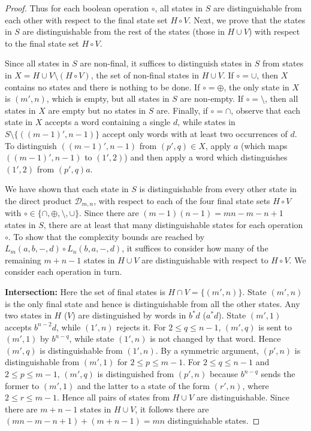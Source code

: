 \documentclass[final]{dmtcs-episciences}
\renewcommand{\le}{\leqslant}
\newcommand{\noin}{\noindent}
\newcommand{\cD}{{\mathcal D}}
\theoremstyle{definition}
\theoremstyle{remark}
\begin{document}
\begin{proof}
Thus for each boolean operation $\circ$, all 
states in $S$ are distinguishable from each other with respect to the final state set $H \circ V$. Next, we prove that the states in $S$ are distinguishable from the rest of the states (those in $H \cup V$) with respect to the final state set $H \circ V$.

Since all states in $S$ are non-final, it suffices to distinguish states in $S$ from states in $X = H \cup V \setminus (H \circ V)$, the set of non-final states in $H \cup V$. If $\circ = \cup$, then $X$ contains no states and there is nothing to be done. 
If $\circ = \oplus$, the only state in $X$ is $(m',n)$, which is empty, but all states in $S$ are non-empty. If $\circ = \setminus$, then all states in $X$ are empty but no states in $S$ are.
Finally, if $\circ = \cap$, observe that each state in $X$ accepts a word containing a single $d$, while states in $S \setminus \{((m-1)',n-1)\}$  accept only words with at least two occurrences of $d$. To distinguish $((m-1)',n-1)$ from $(p',q) \in X$, apply $a$ (which maps $((m-1)',n-1)$ to $(1',2)$) and then apply a word which distinguishes $(1',2)$ from $(p',q)a$.

We have shown that each state in $S$ is distinguishable from every other state in the direct product $\cD_{m,n}$, with respect to each of the four final state sets $H \circ V$ with $\circ \in \{\cap,\oplus,\setminus,\cup\}$.
Since there are $(m-1)(n-1) = mn - m - n + 1$ states in $S$,  there are at least that many distinguishable states for each operation $\circ$.
To show that the complexity bounds are reached by $L_m(a,b,-,d) \circ L_n(b,a,-,d)$, it suffices to consider how many of the remaining $m + n - 1$ states in $H \cup V$ are distinguishable with respect to $H \circ V$.
We consider each operation in turn.

\noin\textbf{Intersection:}
Here the set of final states is $H \cap V = \{(m',n)\}$.
State $(m',n)$ is the only final state and hence is distinguishable from all the other states.
Any two states in $H$ ($V$) are distinguished by words in $b^*d$ ($a^*d$).
State $(m',1)$ accepts $b^{n-2}d$, while $(1',n)$ rejects it.
For $2\le q\le n-1$, $(m',q)$ is sent to $(m',1)$ by $b^{n-q}$, while 
state $(1',n)$ is not changed by that word.
Hence $(m',q)$ is distinguishable from $(1',n)$.
By a symmetric argument, $(p',n)$ is distinguishable from $(m',1)$ for $2 \le p \le m-1$.
For $2\le q\le n-1$ and $2\le p\le m-1$, $(m',q)$ is distinguished from
$(p',n)$ because $b^{n-q}$ sends the former to $(m',1)$ and the latter to a state of the form $(r',n)$, where $2\le r \le m-1$.
Hence all pairs of states from $H \cup V$ are distinguishable. 
Since there are $m + n - 1$ states in $H \cup V$,  it follows there are $(mn - m - n + 1) + (m + n - 1) = mn$ distinguishable states.


\end{proof}
\end{document}
